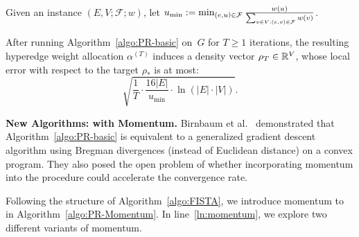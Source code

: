 

\begin{fact}
	\label{fact:PR_error}
	Given an instance $(E, V; \mathcal{F}; w)$,
	let $\\u_{\min} := \min_{(e, u) \in \mathcal {F}} \frac{w(u)}{\sum_{v \in V: (e, v) \in \mathcal {F}} w(v)}$.
	
	After running Algorithm~\ref{algo:PR-basic} on~$G$ 
	for $T \geq 1$ iterations,
	the resulting hyperedge weight allocation $\alpha^{(T)}$
	induces a density vector $\rho_T \in \mathbb{R}^V$,
	whose local error with respect to the target $\rho_*$ is at most:
	$$\sqrt{\frac{1}{T} \cdot \frac{16 |E|}{u_{\min}} \cdot 
	\ln (|E| \cdot |V|)}.$$
\end{fact}


\noindent \textbf{New Algorithms: \pr with Momentum.}
Birnbaum et al.~\cite{DBLP:conf/sigecom/BirnbaumDX11} demonstrated that 
Algorithm~\ref{algo:PR-basic}
is equivalent to a generalized gradient descent algorithm using Bregman divergences (instead of Euclidean distance) on a convex program. They also posed the open problem of whether incorporating momentum into the procedure could accelerate the convergence rate.

Following the structure of Algorithm~\ref{algo:FISTA},
we introduce momentum to \pr in Algorithm~\ref{algo:PR-Momentum}.
In line~\ref{ln:momentum}, we explore two different variants of momentum.

